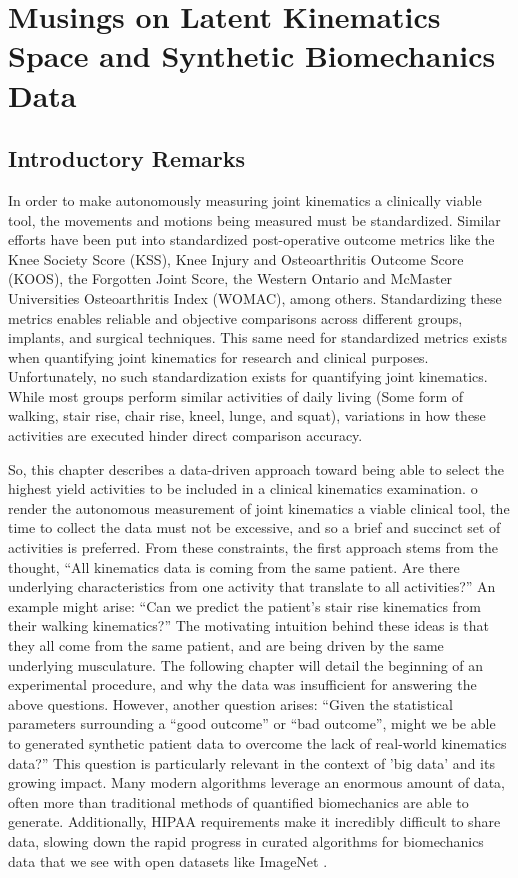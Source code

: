 \chapter{Musings on Latent Kinematics Space and Synthetic Biomechanics Data}

\section{Introductory Remarks}
In order to make autonomously measuring joint kinematics a clinically viable tool, the movements and motions being measured must be standardized.
Similar efforts have been put into standardized post-operative outcome metrics like the Knee Society Score (KSS), Knee Injury and Osteoarthritis Outcome Score (KOOS), the Forgotten Joint Score, the Western Ontario and McMaster Universities Osteoarthritis Index (WOMAC), among others.
Standardizing these metrics enables reliable and objective comparisons across different groups, implants, and surgical techniques.
This same need for standardized metrics exists when quantifying joint kinematics for research and clinical purposes.
Unfortunately, no such standardization exists for quantifying joint kinematics.
While most groups perform similar activities of daily living (Some form of walking, stair rise, chair rise, kneel, lunge, and squat), variations in how these activities are executed hinder direct comparison accuracy.

So, this chapter describes a data-driven approach toward being able to select the highest yield activities to be included in a clinical kinematics examination.
o render the autonomous measurement of joint kinematics a viable clinical tool, the time to collect the data must not be excessive, and so a brief and succinct set of activities is preferred.
From these constraints, the first approach stems from the thought, ``All kinematics data is coming from the same patient. Are there underlying characteristics from one activity that translate to all activities?''
An example might arise: ``Can we predict the patient's stair rise kinematics from their walking kinematics?''
The motivating intuition behind these ideas is that they all come from the same patient, and are being driven by the same underlying musculature.
The following chapter will detail the beginning of an experimental procedure, and why the data was insufficient for answering the above questions.
However, another question arises: ``Given the statistical parameters surrounding a ``good outcome'' or ``bad outcome'', might we be able to generated synthetic patient data to overcome the lack of real-world kinematics data?''
This question is particularly relevant in the context of 'big data' and its growing impact.
Many modern algorithms leverage an enormous amount of data, often more than traditional methods of quantified biomechanics are able to generate.
Additionally, HIPAA requirements make it incredibly difficult to share data, slowing down the rapid progress in curated algorithms for biomechanics data that we see with open datasets like ImageNet \cite{russakovskyImageNetLargeScale2015}.

